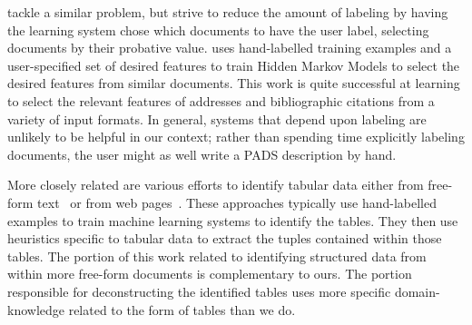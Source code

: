 \citet{muslea+:active-learning} tackle a similar
problem, but strive to reduce the amount of labeling by having the
learning system chose which documents to have the user label,
selecting documents by their probative value.  \citet{borkar+:text-segmentation} uses hand-labelled training
examples and a user-specified set of desired features to train Hidden
Markov Models to select the desired features from similar documents.
This work is quite successful at learning to select the relevant
features of addresses and bibliographic citations from a variety of
input formats. 
In general, systems that depend
upon labeling are unlikely to be helpful in our context; rather than
spending time explicitly labeling documents, the user might as well
write a PADS description by hand.


More closely related are various efforts to identify tabular data 
either from free-form text~\cite{Ng+:texttables,Pinto+:texttables} or
from web pages~\cite{Lerman+:webtables}.  These approaches typically
use hand-labelled examples to train machine learning systems to
identify the tables.  They then use heuristics specific to tabular
data to extract the tuples contained within those tables.  The portion
of this work related to identifying structured data from within more
free-form documents is complementary to ours.  The portion responsible
for deconstructing the identified tables uses more specific
domain-knowledge related to the form of tables than we do.

